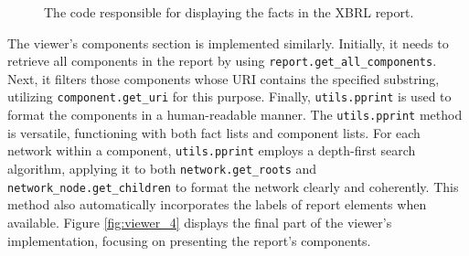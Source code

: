 \begin{figure}[H]
    \centering
    
    \caption{The code responsible for displaying the facts in the XBRL report.}
    \label{fig:viewer_3}
\end{figure}

The viewer's components section is implemented similarly.
Initially, it needs to retrieve all components in the report by using \texttt{report.get\_all\_components}.  
Next, it filters those components whose URI contains the specified substring, utilizing \texttt{component.get\_uri} for this purpose.  
Finally, \texttt{utils.pprint} is used to format the components in a human-readable manner.
The \texttt{utils.pprint} method is versatile, functioning with both fact lists and component lists.  
For each network within a component, \texttt{utils.pprint} employs a depth-first search algorithm,  
applying it to both \texttt{network.get\_roots} and \texttt{network\_node.get\_children} to format the network clearly and coherently.  
This method also automatically incorporates the labels of report elements when available.  
Figure \ref{fig:viewer_4} displays the final part of the viewer's implementation, focusing on presenting the report's components.


